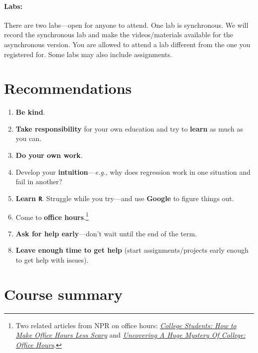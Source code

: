 \documentclass[10pt]{article}
\begin{document}
\paragraph{Labs:} There are two labs---open for anyone to attend. One lab is synchronous. We will record the synchronous lab and make the videos/materials available for the asynchronous version. You are allowed to attend a lab different from the one you registered for. Some labs may also include assignments.

\section*{Recommendations}

\begin{enumerate}
  \item \textbf{Be kind}.
  \item \textbf{Take responsibility} for your own education and try to \textbf{learn} as much as you can.
  \item \textbf{Do your own work}.
  \item Develop your \textbf{intuition}---\textit{e.g.}, why does regression work in one situation and fail in another?
  \item \textbf{Learn \texttt{R}}. Struggle while you try---and use \textbf{Google} to figure things out.
  \item Come to \textbf{office hours}.\footnote{Two related articles from NPR on office hours: \href{https://www.npr.org/2019/10/05/678815966/college-students-how-to-make-office-hours-less-scary}{\textit{College Students: How to Make Office Hours Less Scary}} and \href{https://www.npr.org/2019/10/02/766568824/uncovering-a-huge-mystery-of-college-office-hours}{\textit{Uncovering A Huge Mystery Of College: Office Hours}}.}
  \item \textbf{Ask for help early}---don't wait until the end of the term.
  \item \textbf{Leave enough time to get help} (start assignments/projects early enough to get help with issues).
\end{enumerate}

\section*{Course summary}
\end{document}
